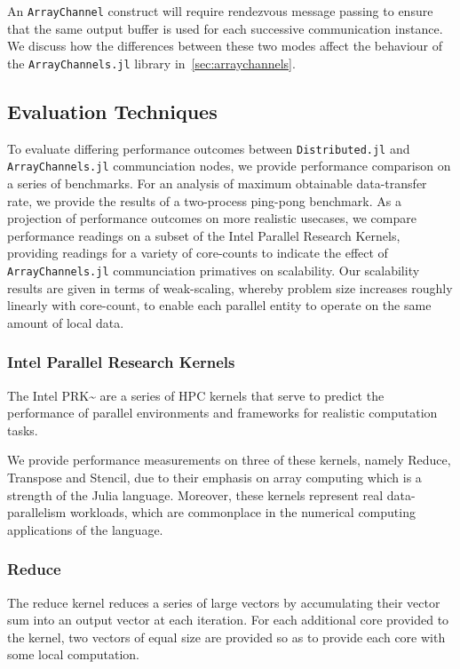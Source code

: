 An \texttt{ArrayChannel} construct will require rendezvous message
passing to ensure that the same output buffer is used for each
successive communication instance. We discuss how the differences
between these two modes affect the behaviour of the
\texttt{ArrayChannels.jl} library in~\ref{sec:arraychannels}.

\subsection{Evaluation Techniques}
\label{sec:eval}

To evaluate differing performance outcomes between
\texttt{Distributed.jl} and \texttt{ArrayChannels.jl} communciation
nodes, we provide performance comparison on a series of benchmarks. For
an analysis of maximum obtainable data-transfer rate, we provide the
results of a two-process ping-pong benchmark. As a projection of
performance outcomes on more realistic usecases, we compare performance
readings on a subset of the Intel Parallel Research Kernels, providing
readings for a variety of core-counts to indicate the effect of
\texttt{ArrayChannels.jl} communciation primatives on scalability. Our
scalability results are given in terms of weak-scaling, whereby problem
size increases roughly linearly with core-count, to enable each parallel
entity to operate on the same amount of local data.

\subsubsection{Intel Parallel Research Kernels}
\label{sec:intel-prk}

The Intel PRK\textasciitilde{}\cite{Wijngaart} are a series of HPC
kernels that serve to predict the performance of parallel environments
and frameworks for realistic computation tasks.

We provide performance measurements on three of these kernels, namely
Reduce, Transpose and Stencil, due to their emphasis on array computing
which is a strength of the Julia language. Moreover, these kernels
represent real data-parallelism workloads, which are commonplace in the
numerical computing applications of the language.

\subsubsection{Reduce}

The reduce kernel reduces a series of large vectors by accumulating
their vector sum into an output vector at each iteration. For each
additional core provided to the kernel, two vectors of equal size are
provided so as to provide each core with some local computation.


